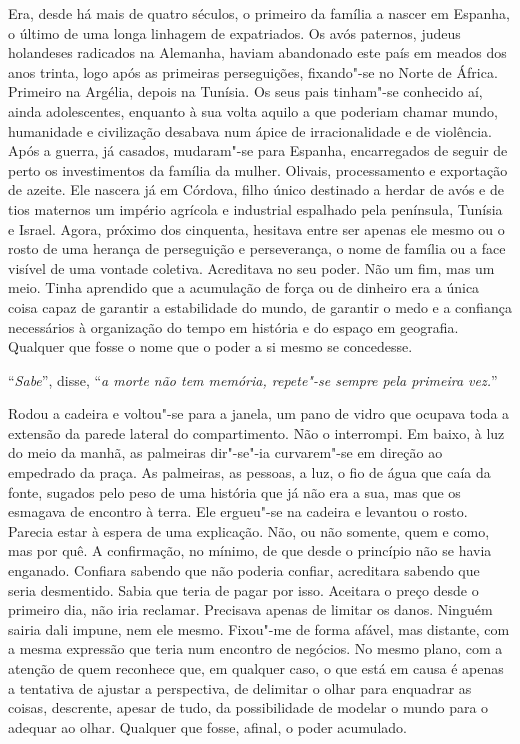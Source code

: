 Era, desde há mais de quatro séculos, o primeiro da família a nascer em
Espanha, o último de uma longa linhagem de expatriados. Os avós
paternos, judeus holandeses radicados na Alemanha, haviam abandonado
este país em meados dos anos trinta, logo após as primeiras
perseguições, fixando"-se no Norte de África. Primeiro na Argélia,
depois na Tunísia. Os seus pais tinham"-se conhecido aí, ainda
adolescentes, enquanto à sua volta aquilo a que poderiam chamar mundo,
humanidade e civilização desabava num ápice de irracionalidade e de
violência. Após a guerra, já casados, mudaram"-se para Espanha,
encarregados de seguir de perto os investimentos da família da mulher.
Olivais, processamento e exportação de azeite. Ele nascera já em
Córdova, filho único destinado a herdar de avós e de tios maternos um
império agrícola e industrial espalhado pela península, Tunísia e
Israel. Agora, próximo dos cinquenta, hesitava entre ser apenas ele
mesmo ou o rosto de uma herança de perseguição e perseverança, o nome de
família ou a face visível de uma vontade coletiva. Acreditava no seu
poder. Não um fim, mas um meio. Tinha aprendido que a acumulação de
força ou de dinheiro era a única coisa capaz de garantir a estabilidade
do mundo, de garantir o medo e a confiança necessários à organização do
tempo em história e do espaço em geografia. Qualquer que fosse o nome
que o poder a si mesmo se concedesse.

``\emph{Sabe}'',
disse,
``\emph{a morte não tem memória, repete"-se sempre pela primeira vez.}''

Rodou a cadeira e voltou"-se para a janela, um pano de vidro que ocupava
toda a extensão da parede lateral do compartimento. Não o interrompi. Em
baixo, à luz do meio da manhã, as palmeiras dir"-se"-ia curvarem"-se em
direção ao empedrado da praça. As palmeiras, as pessoas, a luz, o fio
de água que caía da fonte, sugados pelo peso de uma história que já não
era a sua, mas que os esmagava de encontro à terra. Ele ergueu"-se na
cadeira e levantou o rosto. Parecia estar à espera de uma explicação.
Não, ou não somente, quem e como, mas por quê. A confirmação, no mínimo,
de que desde o princípio não se havia enganado. Confiara sabendo que não
poderia confiar, acreditara sabendo que seria desmentido. Sabia que
teria de pagar por isso. Aceitara o preço desde o primeiro dia, não iria
reclamar. Precisava apenas de limitar os danos. Ninguém sairia dali
impune, nem ele mesmo. Fixou"-me de forma afável, mas distante, com a
mesma expressão que teria num encontro de negócios. No mesmo plano, com
a atenção de quem reconhece que, em qualquer caso, o que está em causa é
apenas a tentativa de ajustar a perspectiva, de delimitar o olhar para
enquadrar as coisas, descrente, apesar de tudo, da possibilidade de
modelar o mundo para o adequar ao olhar. Qualquer que fosse, afinal, o
poder acumulado.

